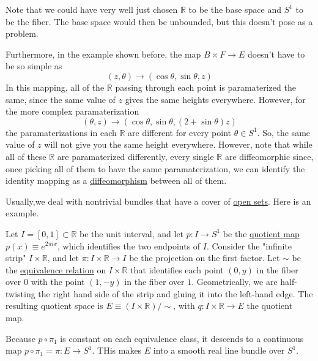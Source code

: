 \documentclass{article}
\newcounter{example}[section]
\begin{document}
  Note that we could have very well just chosen $\mathbb{R}$ to be the base space and $S^1$ to be the fiber. The base space would then be unbounded, but this doesn't pose as a problem. 

  Furthermore, in the example shown before, the map $B \times F \to E$ doesn't have to be so simple as 
  \begin{equation}
    (z, \theta) \to (\cos{\theta}, \sin{\theta}, z)
  \end{equation}
  In this mapping, all of the $\mathbb{R}$ passing through each point is paramaterized the same, since the same value of $z$ gives the same heights everywhere. However, for the more complex paramaterization
  \begin{equation}
    (\theta, z) \to (\cos{\theta}, \sin{\theta}, (2 + \sin{\theta}) z)
  \end{equation}
  the paramaterizations in each $\mathbb{R}$ are different for every point $\theta \in S^1$. So, the same value of $z$ will not give you the same height everywhere. However, note that while all of these $\mathbb{R}$ are paramaterized differently, every single $\mathbb{R}$ are diffeomorphic since, once picking all of them to have the same paramaterization, we can identify the identity mapping as a \hyperref[def:diffeomorphism-2]{diffeomorphism} between all of them. 

  Usually,we deal with nontrivial bundles that have a cover of \hyperref[pst-def:open-set]{open sets}. Here is an example. 

  \begin{example}
    \label{ex:mobius-bundle}
  Let $I = [0,1] \subset \mathbb{R}$ be the unit interval, and let $p: I \to S^1$ be the \hyperref[pst-def:quotient-map]{quotient map} $p(x) \equiv e^{2 \pi i x}$, which identifies the two endpoints of $I$. Consider the "infinite strip" $I \times \mathbb{R}$, and let $\pi: I \times \mathbb{R} \to I$ be the projection on the first factor. Let $\sim$ be the \hyperref[st-def:equivalence_relation]{equivalence relation} on $I \times \mathbb{R}$ that identifies each point $(0,y)$ in the fiber over $0$ with the point $(1, -y)$ in the fiber over $1$. Geometrically, we are half-twisting the right hand side of the strip and gluing it into the left-hand edge. The resulting quotient space is $E \equiv (I \times \mathbb{R})/ \sim$, with $q: I \times \mathbb{R} \to E$ the quotient map. 

  Because $p \circ \pi_1$ is constant on each equivalence class, it descends to a continuous map $p \circ \pi_1 = \pi: E \to S^1$. THis makes $E$ into a smooth real line bundle over $S^1$. 
  \end{example}
\end{document}
